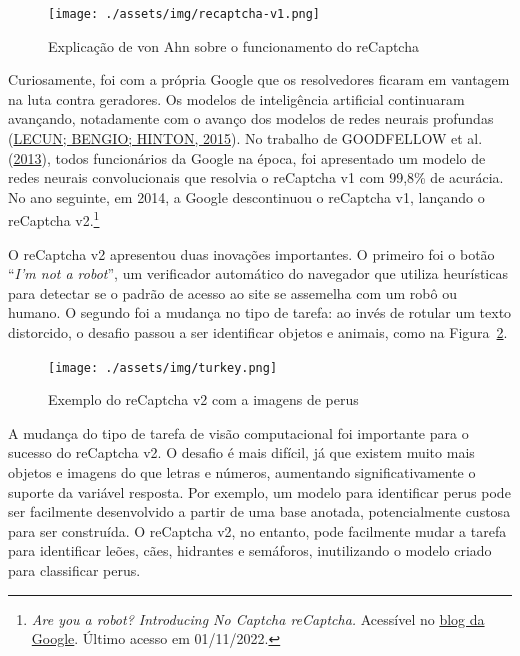 \documentclass[12pt,twoside,brazilian]{book}
\begin{document}
\begin{figure}

{\centering \texttt{[image: ./assets/img/recaptcha-v1.png]}

}

\caption{\label{fig-recaptcha-v1}Explicação de von Ahn sobre o
funcionamento do reCaptcha}

\end{figure}

Curiosamente, foi com a própria Google que os resolvedores ficaram em
vantagem na luta contra geradores. Os modelos de inteligência artificial
continuaram avançando, notadamente com o avanço dos modelos de redes
neurais profundas (\protect\hyperlink{ref-lecun2015}{LECUN; BENGIO;
HINTON, 2015}). No trabalho de GOODFELLOW et al.
(\protect\hyperlink{ref-goodfellow2013}{2013}), todos funcionários da
Google na época, foi apresentado um modelo de redes neurais
convolucionais que resolvia o reCaptcha v1 com 99,8\% de acurácia. No
ano seguinte, em 2014, a Google descontinuou o reCaptcha v1, lançando o
reCaptcha v2.\footnote{\emph{Are you a robot? Introducing No Captcha
  reCaptcha.} Acessível no
  \href{https://security.googleblog.com/2014/12/are-you-robot-introducing-no-captcha.html}{blog
  da Google}. Último acesso em 01/11/2022.}

O reCaptcha v2 apresentou duas inovações importantes. O primeiro foi o
botão ``\emph{I'm not a robot}'', um verificador automático do navegador
que utiliza heurísticas para detectar se o padrão de acesso ao site se
assemelha com um robô ou humano. O segundo foi a mudança no tipo de
tarefa: ao invés de rotular um texto distorcido, o desafio passou a ser
identificar objetos e animais, como na Figura~\ref{fig-turkey}.

\begin{figure}

{\centering \texttt{[image: ./assets/img/turkey.png]}

}

\caption{\label{fig-turkey}Exemplo do reCaptcha v2 com a imagens de
perus}

\end{figure}

A mudança do tipo de tarefa de visão computacional foi importante para o
sucesso do reCaptcha v2. O desafio é mais difícil, já que existem muito
mais objetos e imagens do que letras e números, aumentando
significativamente o suporte da variável resposta. Por exemplo, um
modelo para identificar perus pode ser facilmente desenvolvido a partir
de uma base anotada, potencialmente custosa para ser construída. O
reCaptcha v2, no entanto, pode facilmente mudar a tarefa para
identificar leões, cães, hidrantes e semáforos, inutilizando o modelo
criado para classificar perus.
\end{document}
